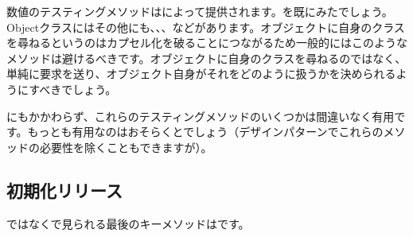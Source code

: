 \documentclass[a4paper,10pt,twoside]{book}
\begin{document}
数値のテスティングメソッドはによって提供されます。を既にみたでしょう。Objectクラスにはその他にも、、、などがあります。オブジェクトに自身のクラスを尋ねるというのはカプセル化を破ることにつながるため一般的にはこのようなメソッドは避けるべきです。オブジェクトに自身のクラスを尋ねるのではなく、単純に要求を送り、オブジェクト自身がそれをどのように扱うかを決められるようにすべきでしょう。

にもかかわらず、これらのテスティングメソッドのいくつかは間違いなく有用です。もっとも有用なのはおそらくとでしょう（\cite{Wool98a}デザインパターンでこれらのメソッドの必要性を除くこともできますが）。


\subsection{初期化リリース}

ではなくで見られる最後のキーメソッドはです。
\end{document}
